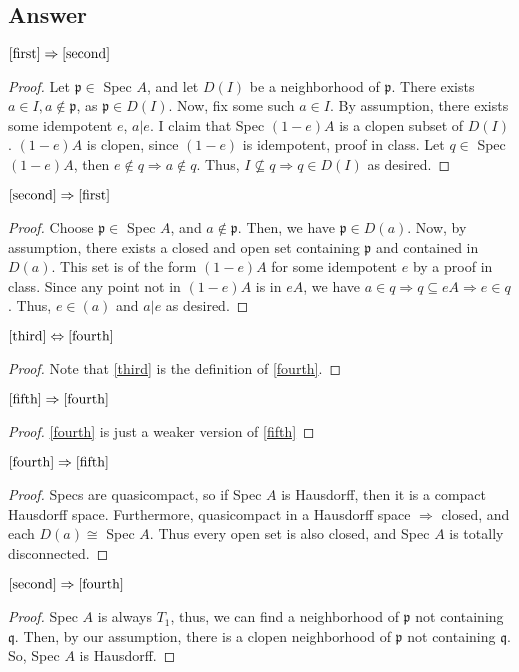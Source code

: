 \documentclass[11pt]{article}
\begin{document}
\subsection{Answer}
$\ref{first}  \Rightarrow \ref{second}$
\begin{proof}
Let $\mathfrak p \in $ Spec $A$, and let $D(I)$ be a neighborhood of $\mathfrak{p}$. There exists $a \in I, a \notin \mathfrak{p}$, as  $\mathfrak{p} \in D(I)$. Now, fix some such $a \in I$. By assumption, there exists some idempotent $e$, $a | e$. I claim that Spec $(1-e)A$ is a clopen subset of $D(I)$. $(1-e)A$ is clopen, since $(1-e)$ is idempotent, proof in class.  Let $ q \in$ Spec $ (1-e)A$, then $e \notin q \Rightarrow a \notin q$. Thus, $I \nsubseteq q \Rightarrow q \in D(I)$ as desired. 
 \end{proof}
 $\ref{second}  \Rightarrow \ref{first}$
\begin{proof}
Choose $\mathfrak{p} \in $ Spec $A$, and $a \notin \mathfrak{p}$. Then, we have $\mathfrak{p} \in D(a)$. Now, by assumption, there exists a closed and open set containing $\mathfrak{p}$ and contained in $D(a)$. This set is of the form $(1-e)A$ for some idempotent $e$ by a proof in class. Since any point not in $(1-e) A $ is in $eA$, we have $a \in q  \Rightarrow q \subseteq eA \Rightarrow e \in q$. Thus, $e \in (a)$  and $a | e $ as desired.
\end{proof}
$\ref{third} \Leftrightarrow \ref{fourth}$
\begin{proof}
Note that \ref{third} is the definition of \ref{fourth}.
\end{proof}

$\ref{fifth} \Rightarrow \ref{fourth}$
\begin{proof} \ref{fourth} is just a weaker version of \ref{fifth} \end{proof}

$\ref{fourth} \Rightarrow \ref{fifth}$
\begin{proof}
Specs are quasicompact, so if Spec $A$ is Hausdorff, then it is a compact Hausdorff space. Furthermore, quasicompact in a Hausdorff space $\Rightarrow$ closed, and each $D(a) \cong $ Spec $A$. Thus every open set is also closed, and Spec $A$ is totally disconnected. 
\end{proof}

$\ref{second} \Rightarrow \ref{fourth}$
\begin{proof}
Spec $A$ is always $T_1$, thus, we can find a neighborhood of $\mathfrak {p}$ not containing $\mathfrak {q}$. Then, by our assumption, there is a clopen neighborhood of $\mathfrak {p}$ not containing $\mathfrak{q}$. So, Spec $A$ is Hausdorff.
\end{proof}
\end{document}

